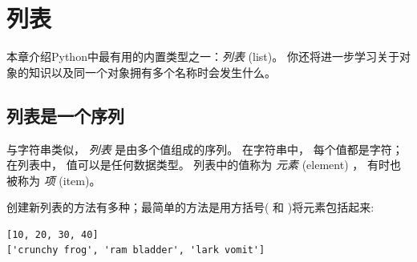 

\chapter{列表}


本章介绍Python中最有用的内置类型之一：{\em 列表} (list)。  你还将进一步学习关于对象的知识以及同一个对象拥有多个名称时会发生什么。

\section{列表是一个序列}
\label{sequence}


与字符串类似， {\em 列表} 是由多个值组成的序列。  在字符串中， 每个值都是字符；
在列表中， 值可以是任何数据类型。  列表中的值称为 {\em 元素} (element) ， 有时也被称为 {\em 项} (item)。

  
  


创建新列表的方法有多种；最简单的方法是用方括号( \li{[} 和 \li{]} )将元素包括起来:

\begin{lstlisting}
[10, 20, 30, 40]
['crunchy frog', 'ram bladder', 'lark vomit']
\end{lstlisting}

%

